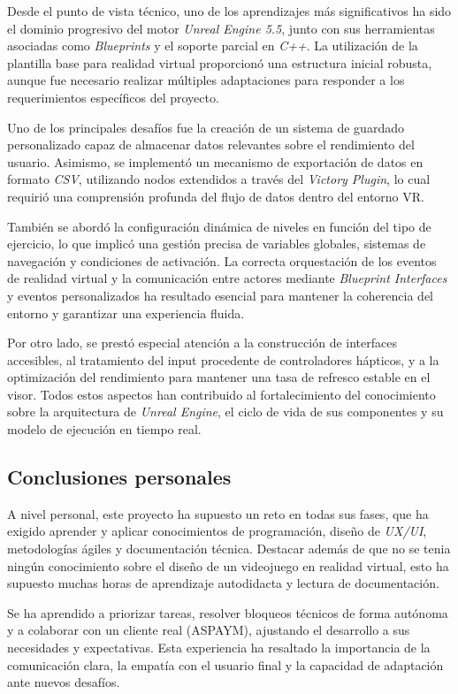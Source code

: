 Desde el punto de vista técnico, uno de los aprendizajes más significativos ha sido el dominio progresivo del motor \textit{Unreal Engine 5.5}, junto con sus herramientas asociadas como \textit{Blueprints} y el soporte parcial en \textit{C++}. La utilización de la plantilla base para realidad virtual proporcionó una estructura inicial robusta, aunque fue necesario realizar múltiples adaptaciones para responder a los requerimientos específicos del proyecto.

Uno de los principales desafíos fue la creación de un sistema de guardado personalizado capaz de almacenar datos relevantes sobre el rendimiento del usuario. Asimismo, se implementó un mecanismo de exportación de datos en formato \textit{CSV}, utilizando nodos extendidos a través del \textit{Victory Plugin}, lo cual requirió una comprensión profunda del flujo de datos dentro del entorno VR.

También se abordó la configuración dinámica de niveles en función del tipo de ejercicio, lo que implicó una gestión precisa de variables globales, sistemas de navegación y condiciones de activación. La correcta orquestación de los eventos de realidad virtual y la comunicación entre actores mediante \textit{Blueprint Interfaces} y eventos personalizados ha resultado esencial para mantener la coherencia del entorno y garantizar una experiencia fluida.

Por otro lado, se prestó especial atención a la construcción de interfaces accesibles, al tratamiento del input procedente de controladores hápticos, y a la optimización del rendimiento para mantener una tasa de refresco estable en el visor. Todos estos aspectos han contribuido al fortalecimiento del conocimiento sobre la arquitectura de \textit{Unreal Engine}, el ciclo de vida de sus componentes y su modelo de ejecución en tiempo real.


\subsection*{Conclusiones personales}

A nivel personal, este proyecto ha supuesto un reto en todas sus fases, que ha exigido aprender y aplicar conocimientos de programación, diseño de \textit{UX/UI}, metodologías ágiles y documentación técnica. Destacar además de que no se tenia ningún conocimiento sobre el diseño de un videojuego en realidad virtual, esto ha supuesto muchas horas de aprendizaje autodidacta y lectura de documentación.

Se ha aprendido a priorizar tareas, resolver bloqueos técnicos de forma autónoma y a colaborar con un cliente real (ASPAYM), ajustando el desarrollo a sus necesidades y expectativas. Esta experiencia ha resaltado la importancia de la comunicación clara, la empatía con el usuario final y la capacidad de adaptación ante nuevos desafíos.

